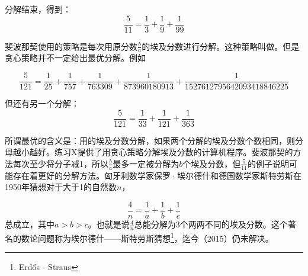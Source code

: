 \documentclass[b5paper]{ctexart}
\begin{document}
分解结束，得到：
\[
\frac{5}{11} = \frac{1}{3} + \frac{1}{9} + \frac{1}{99}
\]

斐波那契使用的策略是每次用原分数$\frac{b}{a}$的埃及分数进行分解。这种策略叫做。但是贪心策略并不一定给出最优分解。例如

\[
\frac{5}{121} = \frac{1}{25} + \frac{1}{757} + \frac{1}{763309} + \frac{1}{873960180913} + \frac{1}{1527612795642093418846225}
\]

但还有另一个分解：
\[
\frac{5}{121} = \frac{1}{33} + \frac{1}{121} + \frac{1}{363}
\]

所谓最优的含义是：用的埃及分数分解，如果两个分解的埃及分数个数相同，则分母越小越好。练习X提供了用贪心策略分解埃及分数的计算机程序。斐波那契的方法每次至少将分子减1，所以$\frac{b}{a}$最多一定被分解为$b$个埃及分数，但$\frac{5}{11}$的例子说明可能存在着更好的分解方法。匈牙利数学家保罗·埃尔德什和德国数学家斯特劳斯在1950年猜想对于大于1的自然数$n$，

\[
\frac{4}{n} = \frac{1}{a} + \frac{1}{b} + \frac{1}{c}
\]
总成立，其中$a > b > c$。也就是说$\frac{4}{n}$总能分解为3个两两不同的埃及分数。这个著名的数论问题称为埃尔德什——斯特劳斯猜想\footnote{Erdős - Straus}，迄今（2015）仍未解决。
\end{document}
